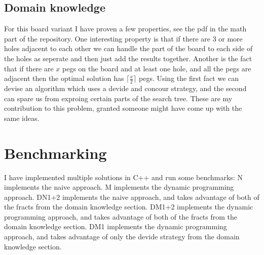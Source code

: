 \documentclass{article}
\begin{document}
\subsection{Domain knowledge}
For this board variant I have proven a few properties, see the pdf in the math part of the repository. One interesting property is that if there are 3 or more holes adjacent to each other we can handle the part of the board to each side of the holes as seperate and then just add the results together. Another is the fact that if there are $x$ pegs on the board and at least one hole, and all the pegs are adjacent then the optimal solution has $\lceil\frac{x}{2}\rceil$ pegs. Using the first fact we can devise an algorithm which uses a devide and concour strategy, and the second can spare us from exproing certain parts of the search tree. These are my contribution to this problem, granted someone might have come up with the same ideas. 

\section{Benchmarking}
I have implemented multiple solutions in C++ and run some benchmarks:
N implements the naive approach. 
M implements the dynamic programming approach. 
DN1+2 implements the naive approach, and takes advantage of both of the fracts from the domain knowledge section. 
DM1+2 implements the dynamic programming approach, and takes advantage of both of the fracts from the domain knowledge section. 
DM1 implements the dynamic programming approach, and takes advantage of only the devide strategy from the domain knowledge section. 
\end{document}
